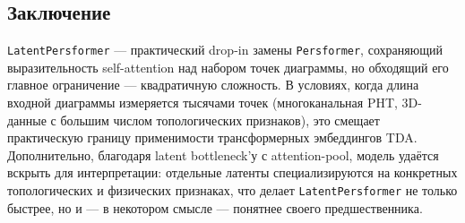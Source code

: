 \subsection{Заключение}

\texttt{LatentPersformer} --- практический drop-in замены \texttt{Persformer}, сохраняющий выразительность self-attention над набором точек диаграммы, но обходящий его главное ограничение --- квадратичную сложность. В условиях, когда длина входной диаграммы измеряется тысячами точек (многоканальная PHT, 3D-данные с большим числом топологических признаков), это смещает практическую границу применимости трансформерных эмбеддингов TDA. Дополнительно, благодаря latent bottleneck'у с attention-pool, модель удаётся вскрыть для интерпретации: отдельные латенты специализируются на конкретных топологических и физических признаках, что делает \texttt{LatentPersformer} не только быстрее, но и --- в некотором смысле --- понятнее своего предшественника.
